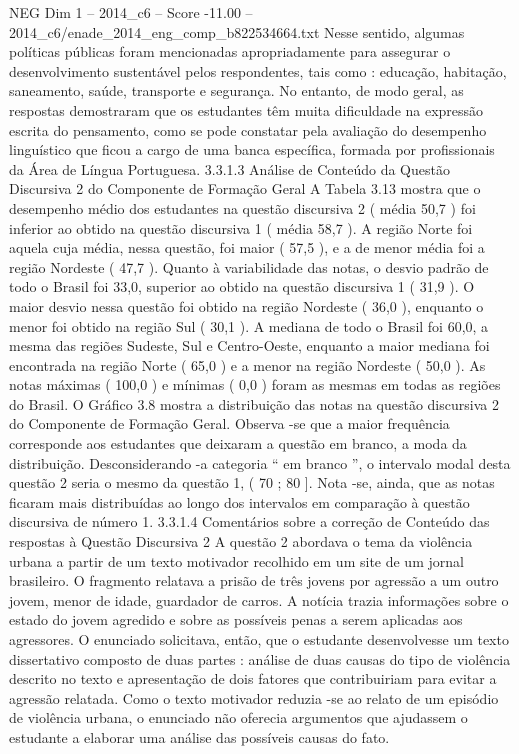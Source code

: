 \begin{textsample}{NEG Dim 1 – 2014\_c6 – Score -11.00 – 2014\_c6/enade\_2014\_eng\_comp\_b822534664.txt}
Nesse sentido, algumas políticas públicas foram mencionadas apropriadamente para assegurar o desenvolvimento sustentável pelos respondentes, tais como : educação, habitação, saneamento, saúde, transporte e segurança.
No entanto, de modo geral, as respostas demostraram que os estudantes têm muita dificuldade na expressão escrita do pensamento, como se pode constatar pela avaliação do desempenho linguístico que ficou a cargo de uma banca específica, formada por profissionais da Área de Língua Portuguesa. 3.3.1.3 Análise de Conteúdo da Questão Discursiva 2 do Componente de Formação Geral A Tabela 3.13 mostra que o desempenho médio dos estudantes na questão discursiva 2 ( média 50,7 ) foi inferior ao obtido na questão discursiva 1 ( média 58,7 ).
A região Norte foi aquela cuja média, nessa questão, foi maior ( 57,5 ), e a de menor média foi a região Nordeste ( 47,7 ).
Quanto à variabilidade das notas, o desvio padrão de todo o Brasil foi 33,0, superior ao obtido na questão discursiva 1 ( 31,9 ).
O maior desvio nessa questão foi obtido na região Nordeste ( 36,0 ), enquanto o menor foi obtido na região Sul ( 30,1 ).
A mediana de todo o Brasil foi 60,0, a mesma das regiões Sudeste, Sul e Centro-Oeste, enquanto a maior mediana foi encontrada na região Norte ( 65,0 ) e a menor na região Nordeste ( 50,0 ).
As notas máximas ( 100,0 ) e mínimas ( 0,0 ) foram as mesmas em todas as regiões do Brasil.
O Gráfico 3.8 mostra a distribuição das notas na questão discursiva 2 do Componente de Formação Geral.
Observa -se que a maior frequência corresponde aos estudantes que deixaram a questão em branco, a moda da distribuição.
Desconsiderando -a categoria “ em branco ”, o intervalo modal desta questão 2 seria o mesmo da questão 1, ( 70 ; 80 ].
Nota -se, ainda, que as notas ficaram mais distribuídas ao longo dos intervalos em comparação à questão discursiva de número 1. 3.3.1.4 Comentários sobre a correção de Conteúdo das respostas à Questão Discursiva 2 A questão 2 abordava o tema da violência urbana a partir de um texto motivador recolhido em um site de um jornal brasileiro.
O fragmento relatava a prisão de três jovens por agressão a um outro jovem, menor de idade, guardador de carros.
A notícia trazia informações sobre o estado do jovem agredido e sobre as possíveis penas a serem aplicadas aos agressores.
O enunciado solicitava, então, que o estudante desenvolvesse um texto dissertativo composto de duas partes : análise de duas causas do tipo de violência descrito no texto e apresentação de dois fatores que contribuiriam para evitar a agressão relatada.
Como o texto motivador reduzia -se ao relato de um episódio de violência urbana, o enunciado não oferecia argumentos que ajudassem o estudante a elaborar uma análise das possíveis causas do fato.

\end{textsample}
